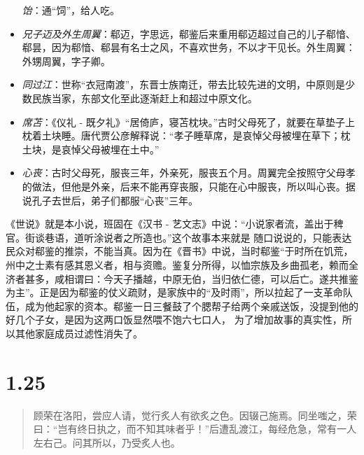 \documentclass[]{book}
\begin{document}
\begin{itemize}
  \emph{饴}：通``饲''，给人吃。
\item
  \emph{兄子迈及外生周翼}：郗迈，字思远，郗鉴后来重用郗迈超过自己的儿子郗愔、郗昙，因为郗愔、郗昙有名士之风，不喜欢世务，不以才干见长。外生周翼：外甥周翼，字子卿。
\item
  \emph{同过江}：世称``衣冠南渡''，东晋士族南迁，带去比较先进的文明，中原则是少数民族当家，东部文化至此逐渐赶上和超过中原文化。
\item
  \emph{席苫}：《仪礼 -
  既夕礼》``居倚庐，寝苫枕块。''古时父母死了，就要在草垫子上枕着土块睡。唐代贾公彦解释说：``孝子睡草席，是哀悼父母被埋在草下；枕土块，是哀悼父母被埋在土中。''
\item
  \emph{心丧}：古时父母死，服丧三年，外亲死，服丧五个月。周翼完全按照守父母孝的做法，但他是外亲，后来不能再穿丧服，只能在心中服丧，所以叫心丧。据说孔子去世后，弟子们都服``心丧''三年。
\end{itemize}

《世说》就是本小说，班固在《汉书 -
艺文志》中说：``小说家者流，盖出于稗官。街谈巷语，道听涂说者之所造也。''这个故事本来就是
随口说说的，只能表达民众对郗鉴的推崇，不能当真。因为在《晋书》中说，当时郗鉴``于时所在饥荒，州中之士素有感其恩义者，相与资赡。鉴复分所得，以恤宗族及乡曲孤老，赖而全济者甚多，咸相谓曰：今天子播越，中原无伯，当归依仁德，可以后亡。遂共推鉴为主''。正是因为郗鉴的仗义疏财，是家族中的``及时雨''，所以拉起了一支革命队伍，成为他起家的资本。郗鉴一日三餐鼓了个腮帮子给两个亲戚送饭，没提到他的好几个子女，是因为这两口饭显然喂不饱六七口人，
为了增加故事的真实性，所以其他家庭成员过滤性消失了。

\section{1.25}\label{section-24}

\begin{quote}
顾荣在洛阳，尝应人请，觉行炙人有欲炙之色。因辍己施焉。同坐嗤之，荣曰：``岂有终日执之，而不知其味者乎！''后遭乱渡江，每经危急，常有一人左右己。问其所以，乃受炙人也。
\end{quote}
\end{document}
